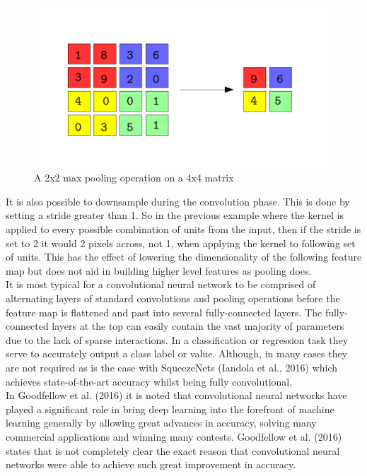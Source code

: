 \documentclass{article}
\begin{document}
\begin{figure}
  \includegraphics[width=\linewidth]{maxpool.pdf}
  \caption{A 2x2 max pooling operation on a 4x4 matrix}
  \label{fig:maxpool}
\end{figure}

It is also possible to downsample during the convolution phase. This is done by setting a stride greater than 1. So in the previous example where the kernel is applied to every possible combination of units from the input, then if the stride is set to 2 it would 2 pixels across, not 1, when applying the kernel to following set of units. This has the effect of lowering the dimensionality of the following feature map but does not aid in building higher level features as pooling does.\\

It is most typical for a convolutional neural network to be comprised of alternating layers of standard convolutions and pooling operations before the feature map is flattened and past into several fully-connected layers. The fully-connected layers at the top can easily contain the vast majority of parameters due to the lack of sparse interactions. In a classification or regression task they serve to accurately output a class label or value. Although, in many cases they are not required as is the case with SqueezeNets (Iandola et al., 2016) which achieves state-of-the-art accuracy whilst being fully convolutional. \\

In Goodfellow et al. (2016) it is noted that convolutional neural networks have played a significant role in bring deep learning into the forefront of machine learning generally by allowing great advances in accuracy, solving many commercial applications and winning many contests. Goodfellow et al. (2016) states that is not completely clear the exact reason that convolutional neural networks were able to achieve such great improvement in accuracy.\\ 
\end{document}
